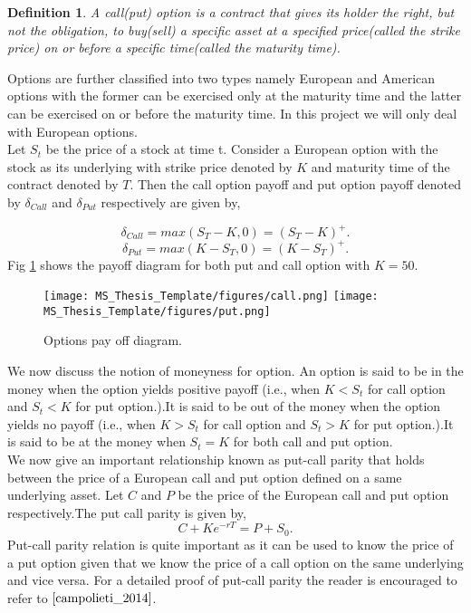 \documentclass[12pt]{report}
\newtheorem{definition}{Definition}[section]
\begin{document}
\begin{definition}A call(put) option is a contract that gives its holder
the right, but not the obligation, to buy(sell) a specific asset at a specified price(called the strike price) on or before a specific time(called the maturity time). 
\end{definition}
Options are further classified into two types namely European and American options with the former can be exercised only at the maturity time and the latter can be exercised on or before the maturity time. In this project we will only deal with European options.\\
Let $S_t$ be the price of a stock at time t. Consider a European option with the stock as its underlying with strike price denoted by $K$ and maturity time of the contract denoted by $T$. Then the call option payoff and put option payoff denoted by $\delta_{Call}$ and $\delta_{Put}$ respectively are given by,

$$\delta_{Call} = max(S_T-K,0)=(S_T-K)^+.$$ $$\delta_{Put}=max(K-S_T,0)=(K-S_T)^+.$$
Fig \ref{payoff} shows the payoff diagram for both put and call option with $K=50$.

\begin{figure}[H]
    \centering
    \texttt{[image: MS\_Thesis\_Template/figures/call.png]}
    \texttt{[image: MS\_Thesis\_Template/figures/put.png]}
    
    
    \caption{Options pay off diagram. }
\label{payoff}    
\end{figure}
We now discuss the notion of moneyness for option. An option is said to be in the money when the option yields positive payoff (i.e., when $K < S_t$ for call option and $S_t < K$ for put option.).It is said to be out of the money when the option yields no payoff (i.e., when $K > S_t$ for call option and $S_t > K$ for put option.).It is said to be at the money when $S_t = K$ for both call and put option.\\
We now give an important relationship known as put-call parity that holds between the price of a European call and put option defined on a same underlying asset. Let $C$ and $P$ be the price of the European call and put option respectively.The put call parity is given by,\\
$$C + Ke^{-rT} = P + S_0. $$
Put-call parity relation is quite important as it can be used to know the price of a put option given that we know the price of a call option on the same underlying and vice versa. For a detailed proof of put-call parity the reader is encouraged to refer to $\cite{campolieti_2014}$.
\end{document}
